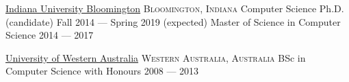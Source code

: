 \documentclass[10pt,a4paper]{article}
\begin{document}

\headedsection
  {\href{http://www.indiana.edu}{Indiana University Bloomington}}
  {\textsc{Bloomington, Indiana}} {%
  \headedsubsection
    {Computer Science Ph.D. (candidate)}
    {Fall 2014 --- Spring 2019 (expected)}
    {}
  \headedsubsection
    {Master of Science in Computer Science}
    {2014 --- 2017}
    {}
}

\headedsection
  {\href{http://www.uwa.edu.au}{University of Western Australia}}
  {\textsc{Western Australia, Australia}} {%
  \headedsubsection
    {BSc in Computer Science with Honours}
    {2008 --- 2013}
    {}
}

%
%
%

%
%


%

\end{document}
